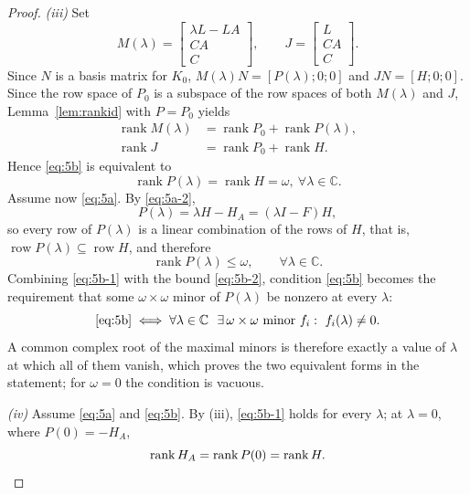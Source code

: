 \documentclass[journal]{IEEEtran}
\theoremstyle{plainn}
\theoremstyle{remark}
\begin{document}
\begin{proof}
\emph{(iii)} Set
\begin{equation*}
M(\lambda)=\begin{bmatrix}
\lambda L-LA\\CA\\C
\end{bmatrix},\qquad J=\begin{bmatrix}
L \\ CA \\C
\end{bmatrix}.
\end{equation*}
Since $N$ is a basis matrix for $K_0$, $M(\lambda)N=[P(\lambda);0;0]$ and $JN=[H;0;0]$.
Since the row space of $P_0$ is a subspace of the row spaces of both $M(\lambda)$ and $J$,
Lemma~\ref{lem:rankid} with $P=P_0$ yields
\begin{equation*}
\begin{aligned}
\operatorname{rank}M(\lambda)&=\operatorname{rank}P_0+\operatorname{rank}P(\lambda),\\
\operatorname{rank}J&=\operatorname{rank}P_0+\operatorname{rank}H .
\end{aligned}
\end{equation*}
Hence \eqref{eq:5b} is equivalent to
\begin{equation}\label{eq:5b-1}
\operatorname{rank}P(\lambda)=\operatorname{rank}H=\omega,\ \forall \lambda\in\mathbb C.
\end{equation}
 Assume now \eqref{eq:5a}. By \eqref{eq:5a-2},
\begin{equation*}
P(\lambda)=\lambda H-H_A=(\lambda I-F)H ,
\end{equation*}
so every row of $P(\lambda)$ is a linear combination of the rows of $H$, that is, $\operatorname{row}P(\lambda)\subseteq\operatorname{row}H$, and therefore
\begin{equation}\label{eq:5b-2}
\operatorname{rank}P(\lambda)\le\omega,\qquad \forall\lambda\in\mathbb C .
\end{equation}
Combining \eqref{eq:5b-1} with the bound \eqref{eq:5b-2}, condition \eqref{eq:5b} becomes the requirement that some $\omega\times\omega$ minor of $P(\lambda)$ be nonzero at every $\lambda$:
\begin{equation*}
\eqref{eq:5b}
\iff
\forall\lambda\in\mathbb C\ \ \exists\,\omega\times\omega\text{ minor } f_i:\ f_i(\lambda)\neq0 .
\end{equation*}
A common complex root of the maximal minors is therefore exactly a value of $\lambda$ at which all of them vanish, which proves the two equivalent forms in the statement; for $\omega=0$ the condition is vacuous.

\emph{(iv)} Assume \eqref{eq:5a} and \eqref{eq:5b}. By (iii), \eqref{eq:5b-1} holds for every $\lambda$; at $\lambda=0$, where $P(0)=-H_A$,
\begin{equation*}
\operatorname{rank}H_A=\operatorname{rank}P(0)=\operatorname{rank}H . \qedhere
\end{equation*}
\end{proof}
\end{document}

